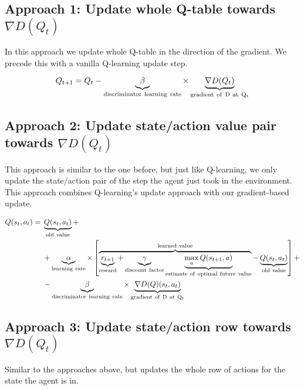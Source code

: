 \subsection{Approach 1: Update whole Q-table towards $\nabla D(Q_{t})$}
\label{ssec:QlearningGANWhole}
In this approach we update whole Q-table in the direction of the gradient. We precede this with a vanilla Q-learning update step.

\begin{equation}
Q_{t+1} = Q_{t}-\underbrace{\beta}_{\rm discriminator~learning~rate} \times \underbrace{\nabla D(Q_{t})}_{\rm gradient~of~D~at~Q_{t}}
\end{equation}

\subsection{Approach 2: Update state/action value pair towards $\nabla D(Q_{t})$}
\label{ssec:QlearningGANPair}
This approach is similar to the one before, but just like Q-learning, we only update the state/action pair of the step the agent just took in the environment. This approach combines Q-learning's update approach with our gradient-based update.

\begin{equation}
\begin{aligned}
  Q(s_{t},a_{t}) ={} &\underbrace{Q(s_t,a_t)}_{\rm old~value} + \\
  & + \underbrace{\alpha}_{\rm learning~rate} \times \left[
    \overbrace{\underbrace{r_{t+1}}_{\rm reward} + \underbrace{\gamma}_{\rm
        discount~factor} \underbrace{\max_{a}Q(s_{t+1}, a)}_{\rm
        estimate~of~optimal~future~value}}^{\rm learned~value} - \underbrace{Q(s_t,a_t)}_{\rm old~value} \right] + \\
   & - \underbrace{\beta}_{\rm discriminator~learning~rate} \times \underbrace{\nabla D(Q)(s_{t}, a_{t})}_{\rm gradient~of~D~at~Q_{t}}
\end{aligned}
\end{equation}

\subsection{Approach 3: Update state/action row towards $\nabla D(Q_{t})$}
\label{ssec:QlearningGANRow}
Similar to the approaches above, but updates the whole row of actions for the state the agent is in.

